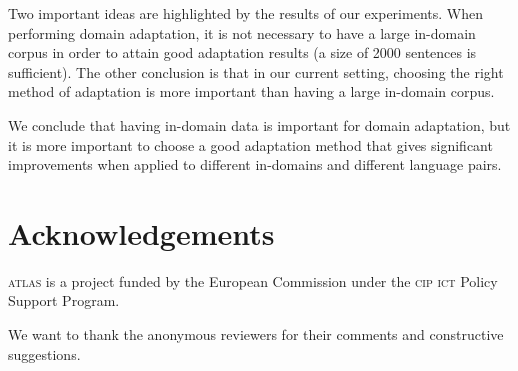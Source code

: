 \documentclass[output=paper]{LSP/langsci}
\begin{document}
Two important ideas are highlighted by the results of our experiments. When performing domain adaptation, it is not necessary to have a large in-domain corpus in order to attain good adaptation results (a size of 2000 sentences is sufficient). The other conclusion is that in our current setting, choosing the right method of adaptation is more important than having a large in-domain corpus.  

We conclude that having in-domain data is important for domain adaptation, but it is more important to choose a good adaptation method that gives significant improvements when applied to different in-domains and different language pairs. 

\section*{Acknowledgements}\label{sec:dumavertan:7}
 
\textsc{atlas} is a project funded by the European Commission under the \textsc{cip ict} Policy Support Program.

We want to thank the anonymous reviewers for their comments and constructive suggestions.

\sloppy
\printbibliography[heading=subbibliography,notkeyword=this]
\end{document}
